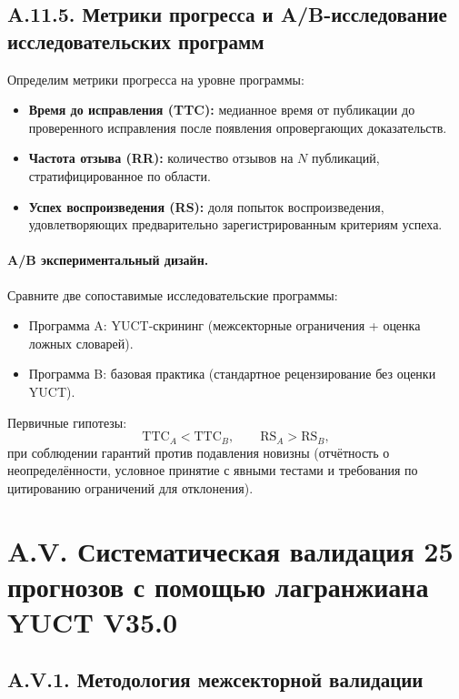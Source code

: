 \documentclass[11pt,a4paper]{article}
\begin{document}
	\subsection*{A.11.5. Метрики прогресса и A/B-исследование исследовательских программ}
	Определим метрики прогресса на уровне программы:
	\begin{itemize}[leftmargin=*]
		\item \textbf{Время до исправления (TTC):} медианное время от публикации до проверенного исправления после появления опровергающих доказательств.
		\item \textbf{Частота отзыва (RR):} количество отзывов на $N$ публикаций, стратифицированное по области.
		\item \textbf{Успех воспроизведения (RS):} доля попыток воспроизведения, удовлетворяющих предварительно зарегистрированным критериям успеха.
	\end{itemize}
	
	\paragraph{A/B экспериментальный дизайн.}
	Сравните две сопоставимые исследовательские программы:
	\begin{itemize}[leftmargin=*]
		\item Программа A: YUCT-скрининг (межсекторные ограничения + оценка ложных словарей).
		\item Программа B: базовая практика (стандартное рецензирование без оценки YUCT).
	\end{itemize}
	Первичные гипотезы:
	$$
	\mathrm{TTC}_A < \mathrm{TTC}_B,\qquad \mathrm{RS}_A > \mathrm{RS}_B,
	$$
	при соблюдении гарантий против подавления новизны (отчётность о неопределённости, условное принятие с явными тестами и требования по цитированию ограничений для отклонения).
	
	\section*{A.V. Систематическая валидация 25 прогнозов с помощью лагранжиана YUCT V35.0}
	
	\subsection*{A.V.1. Методология межсекторной валидации}
	
\end{document}
